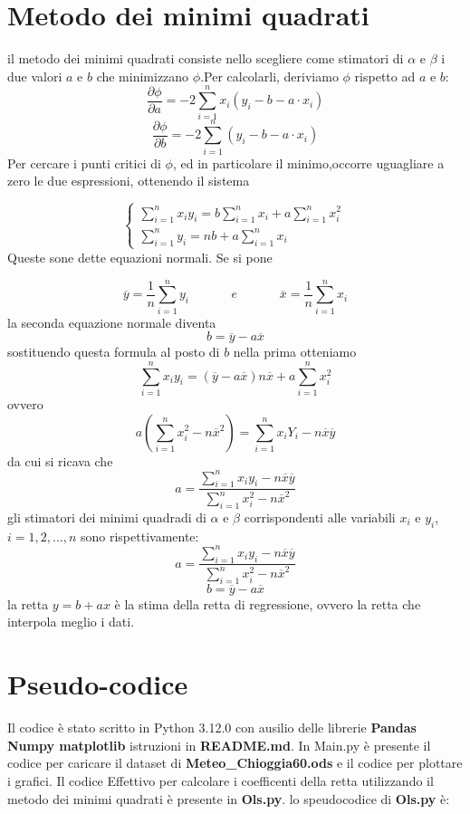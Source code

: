 \documentclass{article}
\begin{document}
\section{Metodo dei minimi quadrati}
il metodo dei minimi quadrati consiste nello scegliere come stimatori di $\alpha$ e $\beta$ i due valori $a$ e $b$ che minimizzano $\phi$.Per calcolarli, deriviamo $\phi$ rispetto ad $a$ e $b$: 
\[
    \frac{\partial \phi} {\partial a} = -2\sum_{i=1}^{n}x_i(y_i-b-a\cdot x_i)
\]
\[
    \frac{\partial \phi} {\partial b} = -2\sum_{i=1}^{n}(y_i-b-a\cdot x_i)
\]
Per cercare i punti critici di $\phi$, ed in particolare il minimo,occorre uguagliare a zero le due espressioni, ottenendo il sistema

\[
\begin{cases}
    \sum_{i=1}^{n}x_i y_i=b\sum_{i=1}^{n}x_i + a\sum_{i=1}^{n}x_i ^2 \\
    \sum_{i=1}^{n}y_i=nb+a\sum_{i=1}^{n}x_i         
\end{cases}\,
\]
Queste sone dette equazioni normali. Se si pone 

\[
    \overline{y}=\frac{1}{n}\sum_{i=1}^{n}y_i \hspace{40pt} e \hspace{40pt} \overline{x}=\frac{1}{n}\sum_{i=1}^{n}x_i
\]
la seconda equazione normale diventa 
\[
    b = \overline{y}-a\overline{x}
\]
sostituendo questa formula al posto di $b$ nella prima otteniamo
\[
    \sum_{i=1}^{n}x_i y_i=(\overline{y}-a\overline{x})n\overline{x}+a\sum_{i=1}^{n}x_i ^2
\]
ovvero
\[
    a(\sum_{i=1}^{n}x_i ^2 -n\overline{x}^2)=\sum_{i=1}^{n}x_i Y_i -n\overline{x}\overline{y}
\]
da cui si ricava che 
\[
    a = \frac{\sum_{i=1}^{n}x_i y_i -n\overline{x}\overline{y}}{\sum_{i=1}^{n}x_i ^2 -n\overline{x}^2}
\]
gli stimatori dei minimi quadradi di $\alpha$ e $\beta$ corrispondenti alle variabili $x_i$ e $y_i$, $i =1,2,...,n$ sono rispettivamente:
\[
    a = \frac{\sum_{i=1}^{n}x_i y_i -n\overline{x}\overline{y}}{\sum_{i=1}^{n}x_i ^2 -n\overline{x}^2}
\]
\[
    b = \overline{y}-a\overline{x}
\]
la retta $y = b + ax$ è la stima della retta di regressione, ovvero la retta che interpola meglio i dati.

\section{Pseudo-codice}

Il codice è stato scritto in Python 3.12.0 con ausilio delle librerie \textbf{Pandas Numpy matplotlib} istruzioni in \textbf{README.md}.
\newline
In Main.py è presente il codice per caricare il dataset di \textbf{Meteo\_Chioggia60.ods} e il codice per plottare i grafici.
\newline
Il codice Effettivo per calcolare i coefficenti della retta utilizzando il metodo dei minimi quadrati è presente in \textbf{Ols.py}.
lo speudocodice di \textbf{Ols.py} è:
\newline
\end{document}
